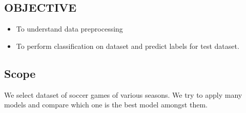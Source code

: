 \documentclass[a4paper, 12pt]{article}
\begin{document}
\newpage
\begin{center}
\section{OBJECTIVE}
\end{center}
\begin{itemize}
   \item To understand data preprocessing
    \item To perform classification on dataset and predict labels for test dataset.
\end{itemize}


\newpage
\begin{center}
\section{Scope}
\end{center}

We select dataset of soccer games of various seasons. We try to apply many models and compare which one is the best model amongst them.
\end{document}
